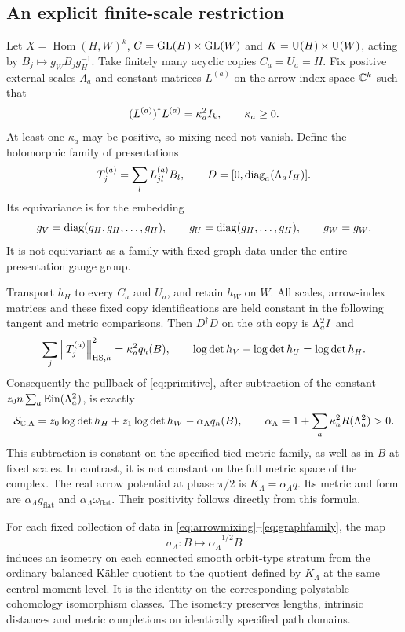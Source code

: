 \subsection{An explicit finite-scale restriction}
Let $X=\operatorname{Hom}(H,W)^k$,
$G=\operatorname{GL}(H)\times\operatorname{GL}(W)$ and $K=\operatorname{U}(H)\times\operatorname{U}(W)$, acting by
$B_j\mapsto g_WB_jg_H^{-1}$. Take finitely many acyclic copies
$C_a=U_a=H$. Fix positive external scales $\Lambda_a$ and constant
matrices $L^{(a)}$ on the arrow-index space $\mathbb C^k$ such that
\begin{equation}\label{eq:arrowmixing}
 (L^{(a)})^\dagger L^{(a)}=\kappa_a^2I_k,\qquad \kappa_a\geq0.
\end{equation}
At least one $\kappa_a$ may be positive, so mixing need not vanish.
Define the holomorphic family of presentations
\begin{equation}\label{eq:graphfamily}
 T_j^{(a)}=\sum_lL_{jl}^{(a)}B_l,\qquad
 D=[0,\operatorname{diag}_a(\Lambda_aI_H)].
\end{equation}
Its equivariance is for the embedding
\[
 g_V=\operatorname{diag}(g_H,g_H,\ldots,g_H),\qquad
 g_U=\operatorname{diag}(g_H,\ldots,g_H),\qquad g_W=g_W.
\]
It is not equivariant as a family with fixed graph data under the
entire presentation gauge group.

Transport $h_H$ to every $C_a$ and $U_a$, and retain $h_W$ on $W$.
All scales, arrow-index matrices and these fixed copy identifications
are held constant in the following tangent and metric comparisons.
Then $D^\dagger D$ on the $a$th copy is $\Lambda_a^2I$ and
\[
 \sum_j\left\lVert T_j^{(a)}\right\rVert_{\mathrm{HS},h}^2
 =\kappa_a^2 q_h(B),\qquad
 \log\det h_V-\log\det h_U=\log\det h_H.
\]
Consequently the pullback of \eqref{eq:primitive}, after subtraction
of the constant $z_0n\sum_a\operatorname{Ein}(\Lambda_a^2)$, is exactly
\begin{equation}\label{eq:graphprimitive}
 \mathcal S_{\mathbb C,\Lambda}
 =z_0\log\det h_H+z_1\log\det h_W-\alpha_\Lambda q_h(B),\qquad
 \alpha_\Lambda=1+\sum_a\kappa_a^2R(\Lambda_a^2)>0.
\end{equation}
This subtraction is constant on the specified tied-metric family,
as well as in $B$ at fixed scales. In contrast, it is not constant
on the full metric space of the complex.
The real arrow potential at phase $\pi/2$ is
$K_\Lambda=\alpha_\Lambda q$. Its metric and form are
$\alpha_\Lambda g_{\mathrm{flat}}$ and
$\alpha_\Lambda\omega_{\mathrm{flat}}$.
Their positivity follows directly from this formula.

\begin{proposition}\label{prop:quotientisometry}
For each fixed collection of data in
\eqref{eq:arrowmixing}--\eqref{eq:graphfamily}, the map
\begin{equation}\label{eq:scaling}
 \sigma_\Lambda:B\longmapsto\alpha_\Lambda^{-1/2}B
\end{equation}
induces an isometry on each connected smooth orbit-type stratum
from the ordinary balanced K\"ahler quotient to the quotient defined
by $K_\Lambda$ at the same central moment level.
It is the identity on the corresponding polystable cohomology
isomorphism classes.
The isometry preserves lengths, intrinsic distances and metric
completions on identically specified path domains.
\end{proposition}

